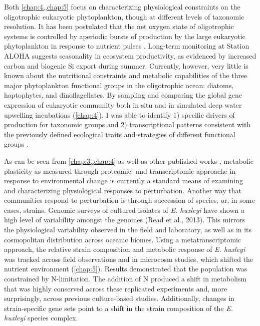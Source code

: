 Both \cref{chap:4,,chap:5} focus on characterizing physiological constraints on the oligotrophic eukaryotic phytoplankton, though at different levels of taxonomic resolution. It has been postulated that the net oxygen state of oligotrophic systems is controlled by aperiodic bursts of production by the large eukaryotic phytoplankton in response to nutrient pulses \citep{Karl2003}. Long-term monitoring at Station ALOHA suggests seasonality in ecosystem productivity, as evidenced by increased carbon and biogenic Si export during summer. Currently, however, very little is known about the nutritional constraints and metabolic capabilities of the three major phytoplankton functional groups in the oligotrophic ocean: diatoms, haptophytes, and dinoflagellates. By sampling and comparing the global gene expression of eukaryotic community both in situ and in simulated deep water upwelling incubations (\cref{chap:4}), I was able to identify 1) specific drivers of production for taxonomic groups and 2) transcriptional patterns consistent with the previously defined ecological traits and strategies of different functional groups \citep{Margalef1978}. \par

As can be seen from \cref{chap:3,,chap:4} as well as other published works \citep{Dyhrman2006, Dyhrman2012, Wurch2011, Bertrand2012a, Jones2013, Bender2014, Frischkorn2014}, metabolic plasticity as measured through proteomic- and transcriptomic-approache in response to environmental change is currently a standard means of examining and characterizing physiological responses to perturbation. Another way that communities respond to perturbation is through succession of species, or, in some cases, strains. Genomic surveys of cultured isolates of \textit{E. huxleyi} have shown a high level of variability amongst the genomes (Read et al., 2013). This mirrors the physiological variability observed in the field and laboratory, as well as in its cosmopolitan distribution across oceanic biomes. Using a metatranscriptomic approach, the relative strain composition and metabolic response of \textit{E. huxleyi} was tracked across field observations and in microcosm studies, which shifted the nutrient environment (\cref{chap:5}). Results demonstrated that the population was constrained by N-limitation. The addition of N produced a shift in metabolism that was highly conserved across these replicated experiments and, more surprisingly, across previous culture-based studies. Additionally, changes in strain-specific gene sets point to a shift in the strain composition of the \textit{E. huxleyi} species complex. 
